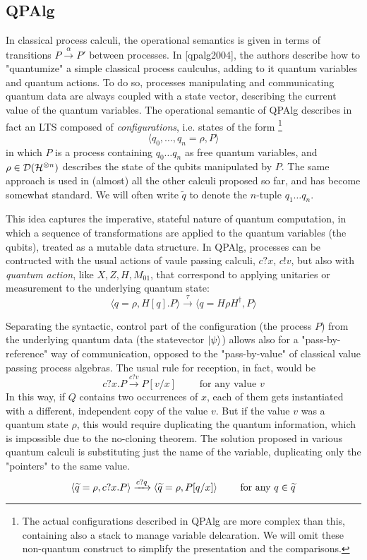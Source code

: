 \subsection{QPAlg}

In classical process calculi, the operational semantics is given in terms of transitions $P \xrightarrow{\alpha} P'$ between processes. In [qpalg2004], the authors describe how to "quantumize" a simple classical process caulculus, adding to it quantum variables and quantum actions. To do so, processes manipulating and communicating quantum data are always coupled with a state vector, describing the current value of the quantum variables. The operational semantic of QPAlg describes in fact an LTS composed of \textit{configurations}, i.e. states of the form \footnote{The actual configurations described in QPAlg are more complex than this, containing also a stack to manage variable delcaration. We will omit these non-quantum construct to simplify the presentation and the comparisons.}
\[
	\langle q_0, \ldots, q_n = \rho, P\rangle
\] 
in which $P$ is a process containing $q_0 \ldots q_n$ as free quantum variables, and $\rho \in \mathcal{D}(\mathcal{H}^{\otimes n})$  describes the state of the qubits manipulated by $P$. The same approach is used in (almost) all the other calculi proposed so far, and has become somewhat standard. We will often write $\widetilde{q}$ to denote the $n$-tuple $q_1 \ldots q_n$. 

This idea captures the imperative, stateful nature of quantum computation, in which a sequence of transformations are applied to the quantum variables (the qubits), treated as a mutable data structure.
In QPAlg, processes can be contructed with the usual actions of vaule passing calculi, $c?x$, $c!v$, but also with \textit{quantum action}, like $X, Z, H, M_{01}$, that correspond to applying unitaries or measurement to the underlying quantum state: \[ \langle q = \rho, H[q].P \rangle \xrightarrow{\tau} \langle q = H\rho H^\dagger, P \rangle\]

Separating the syntactic, control part of the configuration (the process $P$) from the underlying quantum data (the statevector $\ket{\psi}$) allows also for a "pass-by-reference" way of communication, opposed to the "pass-by-value" of classical value passing process algebras.
The usual rule for reception, in fact, would be
\[ c?x.P \xrightarrow{c?v} P[v/x]  \qquad \text{ for any value } v
\]
In this way, if $Q$ contains two occurrences of $x$, each of them gets instantiated with a different, independent copy of the value $v$. But if the value $v$ was a quantum state $\rho$, this would require duplicating the quantum information, which is impossible due to the no-cloning theorem. The solution proposed in various quantum calculi is substituting just the name of the variable, duplicating only the "pointers" to the same value.
\[ \langle \widetilde{q} = \rho, c?x.P \rangle \xrightarrow{c?q} \langle\widetilde{q} = \rho, P[q/x]\rangle \qquad \text{ for any } q \in \widetilde{q}
\]

